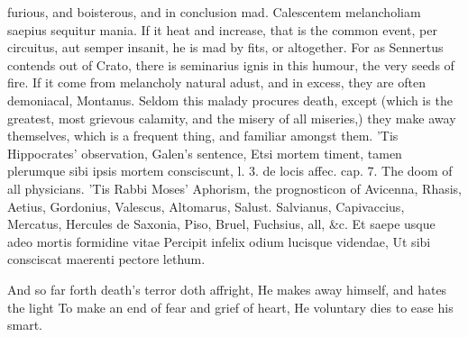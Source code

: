 furious, and boisterous, and in conclusion mad. Calescentem
melancholiam saepius sequitur mania. If it heat and increase,
that is the common event, per circuitus, aut semper insanit, he
is mad by fits, or altogether. For as Sennertus contends out of
Crato, there is seminarius ignis in this humour, the very seeds of
fire. If it come from melancholy natural adust, and in excess, they are
often demoniacal, Montanus.
Seldom this malady procures death, except (which is the greatest,
most grievous calamity, and the misery of all miseries,) they make away
themselves, which is a frequent thing, and familiar amongst them. 'Tis
Hippocrates' observation, Galen's sentence, Etsi mortem timent,
tamen plerumque sibi ipsis mortem consciscunt, l. 3. de locis affec.
cap. 7. The doom of all physicians. 'Tis Rabbi Moses' Aphorism,
the prognosticon of Avicenna, Rhasis, Aetius, Gordonius, Valescus,
Altomarus, Salust. Salvianus, Capivaccius, Mercatus, Hercules de
Saxonia, Piso, Bruel, Fuchsius, all, \&c.
Et saepe usque adeo mortis formidine vitae
Percipit infelix odium lucisque videndae,
Ut sibi consciscat maerenti pectore lethum.

And so far forth death's terror doth affright,
He makes away himself, and hates the light
To make an end of fear and grief of heart,
He voluntary dies to ease his smart.

